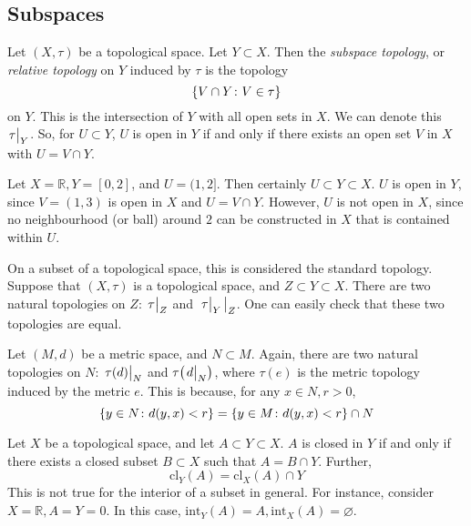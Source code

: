 \subsection{Subspaces}
\begin{definition}
	Let \( (X, \tau) \) be a topological space.
	Let \( Y \subset X \).
	Then the \textit{subspace topology}, or \textit{relative topology} on \( Y \) induced by \( \tau \) is the topology
	\[
		\qty{ V \cap Y \colon V \in \tau }
	\]
	on \( Y \).
	This is the intersection of \( Y \) with all open sets in \( X \).
	We can denote this \( \eval{\tau}_Y \).
	So, for \( U \subset Y \), \( U \) is open in \( Y \) if and only if there exists an open set \( V \) in \( X \) with \( U = V \cap Y \).
\end{definition}
\begin{example}
	Let \( X = \mathbb R, Y = [0,2] \), and \( U = (1,2] \).
	Then certainly \( U \subset Y \subset X \).
	\( U \) is open in \( Y \), since \( V = (1,3) \) is open in \( X \) and \( U = V \cap Y \).
	However, \( U \) is not open in \( X \), since no neighbourhood (or ball) around \( 2 \) can be constructed in \( X \) that is contained within \( U \).
\end{example}
\begin{remark}
	On a subset of a topological space, this is considered the standard topology.
	Suppose that \( (X, \tau) \) is a topological space, and \( Z \subset Y \subset X \).
	There are two natural topologies on \( Z \): \( \eval{\tau}_Z \) and \( \eval{\eval{\tau}_Y}_Z \).
	One can easily check that these two topologies are equal.

	Let \( (M,d) \) be a metric space, and \( N \subset M \).
	Again, there are two natural topologies on \( N \): \( \eval{\tau(d)}_N \) and \( \tau\qty(\eval{d}_N) \), where \( \tau(e) \) is the metric topology induced by the metric \( e \).
	This is because, for any \( x \in N, r > 0 \),
	\[
		\qty{y \in N \colon d(y,x) < r} = \qty{y \in M \colon d(y,x) < r} \cap N
	\]
\end{remark}
\begin{proposition}
	Let \( X \) be a topological space, and let \( A \subset Y \subset X \).
	\( A \) is closed in \( Y \) if and only if there exists a closed subset \( B \subset X \) such that \( A = B \cap Y \).
	Further,
	\[
		\mathrm{cl}_Y(A) = \mathrm{cl}_X(A) \cap Y
	\]
	This is not true for the interior of a subset in general.
	For instance, consider \( X = \mathbb R, A = Y = \qty{0} \).
	In this case, \( \mathrm{int}_Y(A) = A, \mathrm{int}_X(A) = \varnothing \).
\end{proposition}
